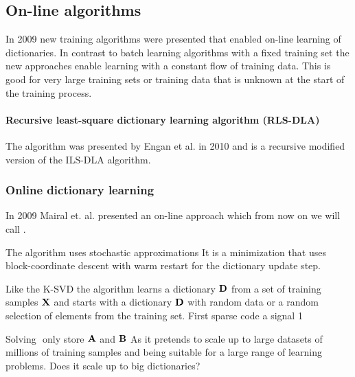 \subsection{On-line algorithms}
In 2009 new training algorithms were presented that enabled on-line learning of
dictionaries. In contrast to batch learning algorithms with a fixed training set
the new approaches enable learning with a constant flow of training data. This
is good for very large training sets or training data that is unknown at the
start of the training process.

\paragraph{Recursive least-square dictionary learning algorithm (RLS-DLA)}
The algorithm was presented by Engan et al. in 2010\cite{Engan2010} and is a
recursive modified version of the ILS-DLA algorithm.


\subsubsection{Online dictionary learning}
\label{sec:mairal}
In 2009 Mairal et. al.\cite{Mairal2009} presented an on-line approach which from
now on we will call \trainDL.

The algorithm uses stochastic approximations 
It is a minimization that uses block-coordinate descent with warm restart for
the dictionary update step.

Like the K-SVD the algorithm learns a dictionary $\boldsymbol{\mathrm{D}}$ from a set of
training samples $\boldsymbol{\mathrm{X}}$ and starts with a dictionary $\boldsymbol{\mathrm{D}}$ with random
data or a random selection of elements from the training set. 
First sparse code a signal  1

Solving $ $ 
only store $\boldsymbol{\mathrm{A}}$ and $\boldsymbol{\mathrm{B}}$ 
As it pretends to scale up to large datasets of millions of training samples
and being suitable for a large range of learning problems.
Does it scale up to big dictionaries?

